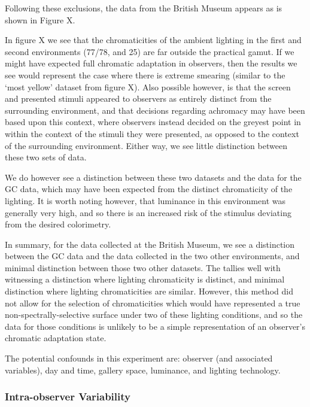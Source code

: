 
Following these exclusions, the data from the British Museum appears as is shown in Figure X. 

In figure X we see that the chromaticities of the ambient lighting in the first and second environments (77/78, and 25) are far outside the practical gamut. If we might have expected full chromatic adaptation in observers, then the results we see would represent the case where there is extreme smearing (similar to the `most yellow' dataset from figure X). Also possible however, is that the screen and presented stimuli appeared to observers as entirely distinct from the surrounding environment, and that decisions regarding achromacy may have been based upon this context, where observers instead decided on the greyest point in within the context of the stimuli they were presented, as opposed to the context of the surrounding environment. Either way, we see little distinction between these two sets of data.

We do however see a distinction between these two datasets and the data for the GC data, which may have been expected from the distinct chromaticity of the lighting. It is worth noting however, that luminance in this environment was generally very high, and so there is an increased risk of the stimulus deviating from the desired colorimetry.

In summary, for the data collected at the British Museum, we see a distinction between the GC data and the data collected in the two other environments, and minimal distinction between those two other datasets. The tallies well with witnessing a distinction where lighting chromaticity is distinct, and minimal distinction where lighting chromaticities are similar. However, this method did not allow for the selection of chromaticities which would have represented a true non-spectrally-selective surface under two of these lighting conditions, and so the data for those conditions is unlikely to be a simple representation of an observer's chromatic adaptation state.

The potential confounds in this experiment are: observer (and associated variables), day and time, gallery space, luminance, and lighting technology.

\subsubsection{Intra-observer Variability}

